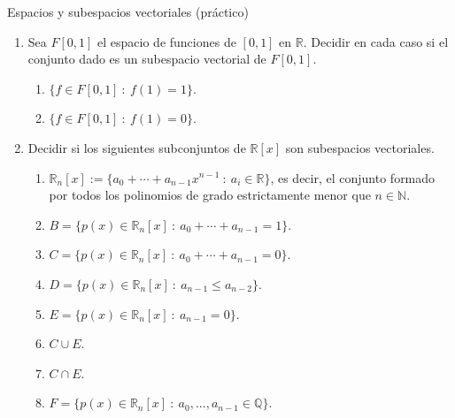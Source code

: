 \begin{chapter}{Espacios y subespacios vectoriales (práctico)}
\begin{enumerate}[resume, topsep=6pt, itemsep=.4cm]
\item\label{sub funciones} Sea $F[0,1]$ el espacio de funciones de $[0,1]$ en $\mathbb{R}$. Decidir en cada caso si el conjunto dado es un subespacio vectorial de $F[0,1]$.
    \begin{enumerate}
    \item\label{sub funciones 1} $\{ f \in F[0,1] \ : \ f(1) = 1 \}$.
    \item\label{sub funciones 0} $\{ f \in F[0,1] \ : \ f(1) = 0\}$.
\end{enumerate}
    
    \item\label{sub polinomios} Decidir si los siguientes subconjuntos de $\mathbb{R}[x]$ son subespacios vectoriales.

    \begin{enumerate}
     \item $\mathbb{R}_{n}[x] := \{ a_0 + \cdots + a_{n-1}x^{n-1} \ : \ a_i \in \mathbb{R}\}$, es decir, el conjunto formado por todos los polinomios de grado estrictamente menor que $n\in\mathbb{N}$.

     \item $B=\{p(x)\in\mathbb{R}_{n}[x] \ : \ a_0 + \cdots + a_{n-1} = 1\}$.
     \item $C=\{p(x)\in\mathbb{R}_{n}[x] \ : \ a_0 + \cdots + a_{n-1} = 0\}$.
     \item $D=\{p(x)\in\mathbb{R}_{n}[x] \ : \ a_{n-1} \le a_{n-2}\}$.
     \item $E=\{p(x)\in\mathbb{R}_{n}[x] \ : \ a_{n-1}=0\}$.
     \item $C\cup E$.
     \item $C\cap E$.
     \item $F=\{p(x)\in\mathbb{R}_{n}[x] \ : \  a_0, ..., a_{n-1}\in\mathbb{Q}\}$.
%     
%
     \end{enumerate}



\end{enumerate}
\end{chapter}
